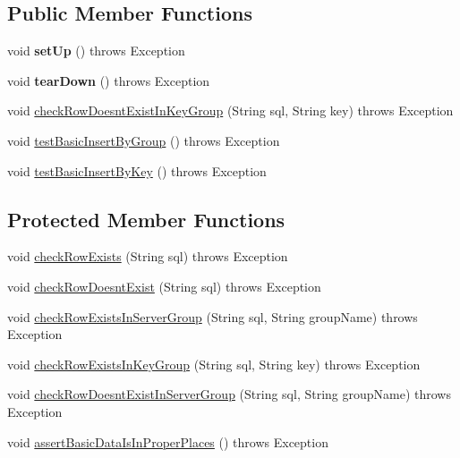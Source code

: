 \subsection*{Public Member Functions}
\begin{DoxyCompactItemize}
\item 
\mbox{\label{classtestsuite_1_1fabric_1_1jdbc_1_1_test_hash_sharding_a5c72e988df6e627f01d5d483ac7ae79a}} 
void {\bfseries set\+Up} ()  throws Exception 
\item 
\mbox{\label{classtestsuite_1_1fabric_1_1jdbc_1_1_test_hash_sharding_ac2a8ba60f2bee4744a6735d1f4d2ef14}} 
void {\bfseries tear\+Down} ()  throws Exception 
\item 
void \mbox{\hyperlink{classtestsuite_1_1fabric_1_1jdbc_1_1_test_hash_sharding_aa64b14c5407a2f6c4128fa8bf3f27b6f}{check\+Row\+Doesnt\+Exist\+In\+Key\+Group}} (String sql, String key)  throws Exception 
\item 
void \mbox{\hyperlink{classtestsuite_1_1fabric_1_1jdbc_1_1_test_hash_sharding_a4d63bb47eb2f1bc8fcbc57257a21def1}{test\+Basic\+Insert\+By\+Group}} ()  throws Exception 
\item 
void \mbox{\hyperlink{classtestsuite_1_1fabric_1_1jdbc_1_1_test_hash_sharding_aae506b3baba9edbc0b43d3f4d5f6e308}{test\+Basic\+Insert\+By\+Key}} ()  throws Exception 
\end{DoxyCompactItemize}
\subsection*{Protected Member Functions}
\begin{DoxyCompactItemize}
\item 
void \mbox{\hyperlink{classtestsuite_1_1fabric_1_1jdbc_1_1_test_hash_sharding_a62e92dd2a4d030bd60a3812e4561094b}{check\+Row\+Exists}} (String sql)  throws Exception 
\item 
void \mbox{\hyperlink{classtestsuite_1_1fabric_1_1jdbc_1_1_test_hash_sharding_ae116d36f4a6b60e7a5e0faf1f7a7774f}{check\+Row\+Doesnt\+Exist}} (String sql)  throws Exception 
\item 
void \mbox{\hyperlink{classtestsuite_1_1fabric_1_1jdbc_1_1_test_hash_sharding_a9d7cbb774663dec35a3f486d09f5d124}{check\+Row\+Exists\+In\+Server\+Group}} (String sql, String group\+Name)  throws Exception 
\item 
void \mbox{\hyperlink{classtestsuite_1_1fabric_1_1jdbc_1_1_test_hash_sharding_a004334f5d0b85fae53d4d2034457dd84}{check\+Row\+Exists\+In\+Key\+Group}} (String sql, String key)  throws Exception 
\item 
void \mbox{\hyperlink{classtestsuite_1_1fabric_1_1jdbc_1_1_test_hash_sharding_afe45f293836ac4ee4e67255e208fb36b}{check\+Row\+Doesnt\+Exist\+In\+Server\+Group}} (String sql, String group\+Name)  throws Exception 
\item 
void \mbox{\hyperlink{classtestsuite_1_1fabric_1_1jdbc_1_1_test_hash_sharding_a54c7662d69f56fc657d35bd049d87f1b}{assert\+Basic\+Data\+Is\+In\+Proper\+Places}} ()  throws Exception 
\end{DoxyCompactItemize}
